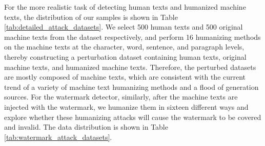 \documentclass[11pt]{article}
\begin{document}
For the more realistic task of detecting human texts and humanized machine texts, the distribution of our samples is shown in Table \ref{tab:detailed_attack_datasets}. We select 500 human texts and 500 original machine texts from the dataset respectively, and perform 16 humanizing methods on the machine texts at the character, word, sentence, and paragraph levels, thereby constructing a perturbation dataset containing human texts, original machine texts, and humanized machine texts. Therefore, the perturbed datasets are mostly composed of machine texts, which are consistent with the current trend of a variety of machine text humanizing methods and a flood of generation sources. For the watermark detector, similarly, after the machine texts are injected with the watermark, we humanize them in sixteen different ways and explore whether these humanizing attacks will cause the watermark to be covered and invalid. The data distribution is shown in Table \ref{tab:watermark_attack_datasets}.
\end{document}
